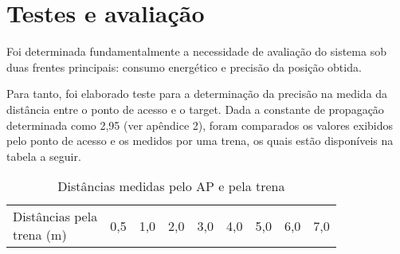 \chapter{Testes e avaliação}

Foi determinada fundamentalmente a necessidade de avaliação do sistema sob duas frentes principais: consumo energético e precisão da posição obtida. 

Para tanto, foi elaborado teste para a determinação da precisão na medida da distância entre o ponto de acesso e o target. Dada a constante de propagação determinada como 2,95 (ver apêndice 2), foram comparados os valores exibidos pelo ponto de acesso e os medidos por uma trena, os quais estão disponíveis na tabela a seguir.

\begin{table}[ht]
\centering
\caption{Distâncias medidas pelo AP e pela trena}
\vspace{0.5cm}
\begin{tabular}{l|cccccccc}
\hline
\makecell{Distâncias pela \\ trena (m)} & 0,5 & 1,0 & 2,0 & 3,0 & 4,0 & 5,0 & 6,0 & 7,0 \vspace{0.4cm}\\


\end{tabular}
\end{table}
